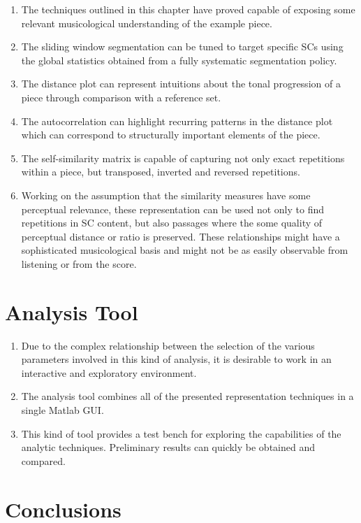 \documentclass{article}
\begin{document}
\begin{enumerate}
\item The techniques outlined in this chapter have proved capable of
   exposing some relevant musicological understanding of the example
   piece.
\item The sliding window segmentation can be tuned to target specific SCs
   using the global statistics obtained from a fully systematic
   segmentation policy.
\item The distance plot can represent intuitions about the tonal
   progression of a piece through comparison with a reference set.
\item The autocorrelation can highlight recurring patterns in the distance
   plot which can correspond to structurally important elements of the
   piece.
\item The self-similarity matrix is capable of capturing not only exact
   repetitions within a piece, but transposed, inverted and reversed
   repetitions.
\item Working on the assumption that the similarity measures have some
   perceptual relevance, these representation can be used not only to
   find repetitions in SC content, but also passages where the some
   quality of perceptual distance or ratio is preserved. These
   relationships might have a sophisticated musicological basis and
   might not be as easily observable from listening or from the score.
\end{enumerate}
\section{Analysis Tool}
\label{sec-10}

\begin{enumerate}
\item Due to the complex relationship between the selection of the various
   parameters involved in this kind of analysis, it is desirable to
   work in an interactive and exploratory environment.
\item The analysis tool combines all of the presented representation
   techniques in a single Matlab GUI.
\item This kind of tool provides a test bench for exploring the
   capabilities of the analytic techniques. Preliminary results can
   quickly be obtained and compared.
\end{enumerate}
\section{Conclusions}
\label{sec-11}
\end{document}
